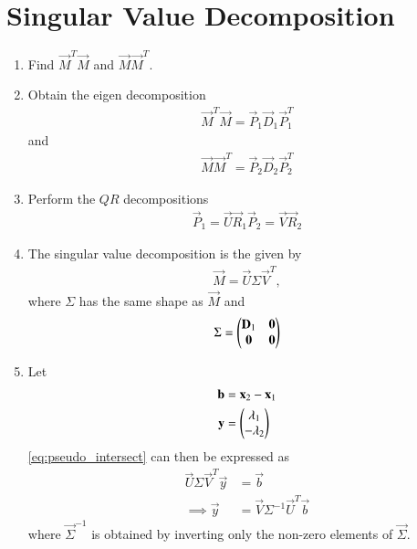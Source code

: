 \documentclass[journal,12pt,twocolumn]{IEEEtran}
\renewcommand\thesection{\arabic{section}}
\begin{document}
\section{Singular Value Decomposition}
\begin{enumerate}[label=\thesection.\arabic*.,ref=\thesection.\theenumi]

\item Find $\vec{M}^T\vec{M}$ and $\vec{M}\vec{M}^T$.
\item Obtain the eigen decomposition 
\begin{align}
\vec{M}^T\vec{M} = \vec{P}_1\vec{D}_1\vec{P}_1^T
\end{align}
and 
\begin{align}
\vec{M}\vec{M}^T = \vec{P}_2\vec{D}_2\vec{P}_2^T
\end{align}
\item Perform the $QR$ decompositions
\begin{align}
\vec{P}_1 = \vec{U}\vec{R}_1
\vec{P}_2 = \vec{V}\vec{R}_2
\end{align}
\item The singular value decomposition is the given by
\begin{align}
\vec{M} = \vec{U} \Sigma \vec{V}^T,
\end{align}
where $\Sigma$ has the same shape as $\vec{M}$ and
\begin{align}
\Sigma = \begin{pmatrix}\mathbf{D}_1 & \mathbf{0} \\ \mathbf{0} & \mathbf{0}\end{pmatrix}
\end{align}
\item Let
\begin{align}
	\mathbf{b} &= 
	\mathbf{x}_2-\mathbf{x}_1
	\\
	\mathbf{y} &= \begin{pmatrix}\lambda_1 \\ - \lambda_2\end{pmatrix}
\end{align}
\eqref{eq:pseudo_intersect}
can then be expressed as
\begin{align}
\vec{U} \Sigma \vec{V}^T \vec{y} &= \vec{b}
\\
\implies \vec{y} & = \vec{V}\Sigma^{-1} \vec{U}^T \vec{b}
\end{align}
%
where $\vec{\Sigma}^{-1}$ is obtained by inverting  only the non-zero elements of $\vec{\Sigma}$.
\end{enumerate}
\end{document}
